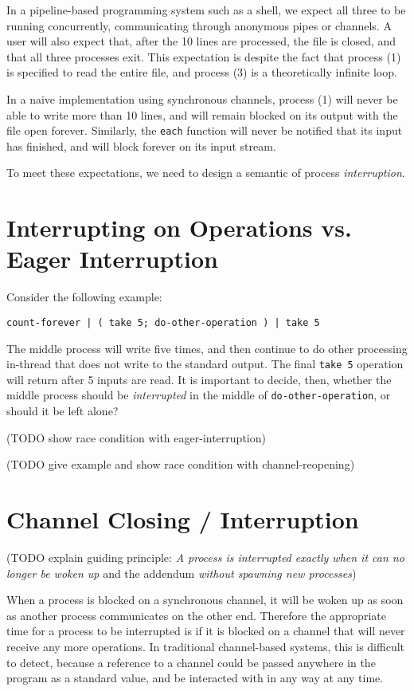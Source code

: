 \documentclass[format=sigconf, review=true, draft=true, screen=true]{acmart}
\begin{document}
In a pipeline-based programming system such as a shell, we expect all three to be running concurrently, communicating through anonymous pipes or channels.
A user will also expect that, after the 10 lines are processed, the file is closed, and that all three processes exit.
This expectation is despite the fact that process (1) is specified to read the entire file, and process (3) is a theoretically infinite loop.

In a naive implementation using synchronous channels, process (1) will never be able to write more than 10 lines, and will remain blocked on its output with the file open forever.
Similarly, the \verb/each/ function will never be notified that its input has finished, and will block forever on its input stream.

To meet these expectations, we need to design a semantic of process \emph{interruption}.

\section{Interrupting on Operations vs. Eager Interruption}

Consider the following example:

\begin{verbatim}
count-forever | ( take 5; do-other-operation ) | take 5
\end{verbatim}

The middle process will write five times, and then continue to do other processing in-thread that does not write to the standard output. 
The final \verb/take 5/ operation will return after 5 inputs are read.
It is important to decide, then, whether the middle process should be \emph{interrupted} in the middle of \verb/do-other-operation/, or should it be left alone?

(TODO show race condition with eager-interruption)

(TODO give example and show race condition with channel-reopening)

\section{Channel Closing / Interruption}

(TODO explain guiding principle: \emph{A process is interrupted exactly when it can no longer be woken up} and the addendum \emph{without spawning new processes})

When a process is blocked on a synchronous channel, it will be woken up as soon as another process communicates on the other end.
Therefore the appropriate time for a process to be interrupted is if it is blocked on a channel that will never receive any more operations.
In traditional channel-based systems, this is difficult to detect, because a reference to a channel could be passed anywhere in the program as a standard value, and be interacted with in any way at any time.
\end{document}
